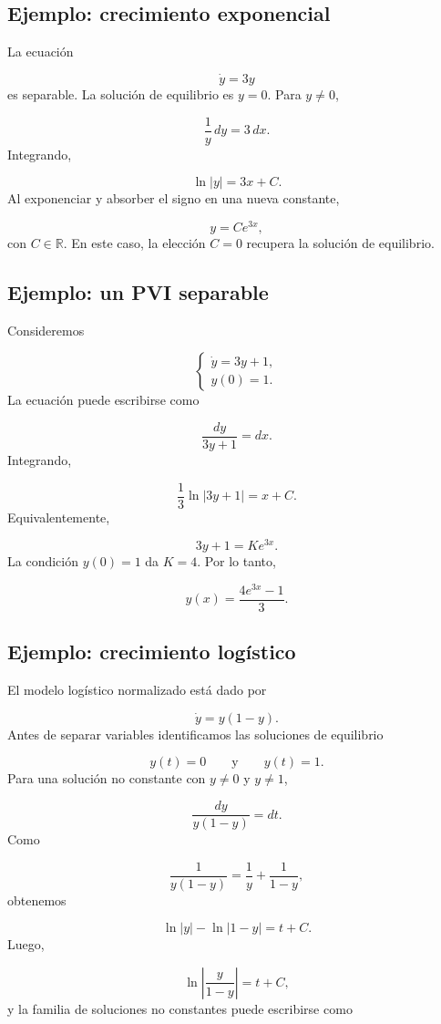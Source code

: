 \documentclass[12pt,a4paper]{article}
\begin{document}
	\subsection{Ejemplo: crecimiento exponencial}

	La ecuación

	\[
	\dot{y}=3y
	\]
es separable. La solución de equilibrio es \(y=0\). Para \(y\neq 0\),

	\[
	\frac{1}{y}\,dy=3\,dx.
	\]
	\newpage
	Integrando,

	\[
	\ln|y|=3x+C.
	\]
Al exponenciar y absorber el signo en una nueva constante,

	\[
	y=Ce^{3x},
	\]
con \(C\in\mathbb{R}\). En este caso, la elección \(C=0\) recupera la solución de equilibrio.

	\subsection{Ejemplo: un PVI separable}

	Consideremos

	\[
	\begin{cases}
		\dot{y}=3y+1,\\
		y(0)=1.
	\end{cases}
	\]
La ecuación puede escribirse como

	\[
	\frac{dy}{3y+1}=dx.
	\]
Integrando,

	\[
	\frac{1}{3}\ln|3y+1|=x+C.
	\]
Equivalentemente,

	\[
	3y+1=Ke^{3x}.
	\]
La condición \(y(0)=1\) da \(K=4\). Por lo tanto,

	\[
	y(x)=\frac{4e^{3x}-1}{3}.
	\]
	\subsection{Ejemplo: crecimiento logístico}

	El modelo logístico normalizado está dado por

	\[
	\dot{y}=y(1-y).
	\]
Antes de separar variables identificamos las soluciones de equilibrio

	\[
	y(t)=0
	\qquad\text{y}\qquad
	y(t)=1.
	\]
Para una solución no constante con \(y\neq 0\) y \(y\neq 1\),

	\[
	\frac{dy}{y(1-y)}=dt.
	\]
	\newpage
	Como

	\[
	\frac{1}{y(1-y)}=\frac{1}{y}+\frac{1}{1-y},
	\]
	obtenemos

	\[
	\ln|y|-\ln|1-y|=t+C.
	\]
Luego,

	\[
	\ln\left|\frac{y}{1-y}\right|=t+C,
	\]
y la familia de soluciones no constantes puede escribirse como
\end{document}
